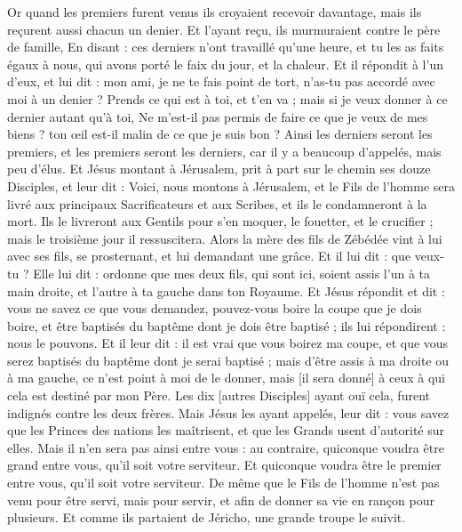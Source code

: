 \begin{multicols}{2}
Or quand les premiers furent venus ils croyaient recevoir davantage, mais ils reçurent aussi chacun un denier.
Et l'ayant reçu, ils murmuraient contre le père de famille,
En disant : ces derniers n'ont travaillé qu'une heure, et tu les as faits égaux à nous, qui avons porté le faix du jour, et la chaleur.
Et il répondit à l'un d'eux, et lui dit : mon ami, je ne te fais point de tort, n'as-tu pas accordé avec moi à un denier ?
Prends ce qui est à toi, et t'en va ; mais si je veux donner à ce dernier autant qu'à toi,
Ne m'est-il pas permis de faire ce que je veux de mes biens ? ton œil est-il malin de ce que je suis bon ?
Ainsi les derniers seront les premiers, et les premiers seront les derniers, car il y a beaucoup d'appelés, mais peu d'élus.
Et Jésus montant à Jérusalem, prit à part sur le chemin ses douze Disciples, et leur dit :
Voici, nous montons à Jérusalem, et le Fils de l'homme sera livré aux principaux Sacrificateurs et aux Scribes, et ils le condamneront à la mort.
Ils le livreront aux Gentils pour s'en moquer, le fouetter, et le crucifier ; mais le troisième jour il ressuscitera.
Alors la mère des fils de Zébédée vint à lui avec ses fils, se prosternant, et lui demandant une grâce.
Et il lui dit : que veux-tu ? Elle lui dit : ordonne que mes deux fils, qui sont ici, soient assis l'un à ta main droite, et l'autre à ta gauche dans ton Royaume.
Et Jésus répondit et dit : vous ne savez ce que vous demandez, pouvez-vous boire la coupe que je dois boire, et être baptisés du baptême dont je dois être baptisé ; ils lui répondirent : nous le pouvons.
Et il leur dit : il est vrai que vous boirez ma coupe, et que vous serez baptisés du baptême dont je serai baptisé ; mais d'être assis à ma droite ou à ma gauche, ce n'est point à moi de le donner, mais [il sera donné] à ceux à qui cela est destiné par mon Père.
Les dix [autres Disciples] ayant ouï cela, furent indignés contre les deux frères.
Mais Jésus les ayant appelés, leur dit : vous savez que les Princes des nations les maîtrisent, et que les Grands usent d'autorité sur elles.
Mais il n'en sera pas ainsi entre vous : au contraire, quiconque voudra être grand entre vous, qu'il soit votre serviteur.
Et quiconque voudra être le premier entre vous, qu'il soit votre serviteur.
De même que le Fils de l'homme n'est pas venu pour être servi, mais pour servir, et afin de donner sa vie en rançon pour plusieurs.
Et comme ils partaient de Jéricho, une grande troupe le suivit.

\end{multicols}
